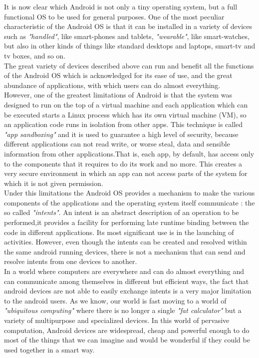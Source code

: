  It is now clear which Android is not only a tiny operating system, but a full functional OS to be used for general purposes. One of the most peculiar characteristic of the Android OS is that it can be installed in a variety of devices such as \textit{"handled"}, like smart-phones and tablets, \textit{"wearable"}, like smart-watches, but also in other kinds of things like standard desktops and laptops, smart-tv and tv boxes, and so on.\\
The great variety of devices described above can run and benefit all the functions of the Android OS which is acknowledged for its ease of use, and the great abundance of applications, with which users can do almost everything. \\
However, one of the greatest limitations of Android is that the system was designed to run on the top of a virtual machine and each  application which can be executed starts a Linux process which has its own virtual machine (VM), so an application code runs in isolation from other apps. This technique is called \textit{"app sandboxing"} and it is used to guarantee a high level of security, because different applications can not read write, or worse steal, data and sensible information from other applications.That is, each app, by default, has access only to the components that it requires to do its work and no more. This creates a very secure environment in which an app can not access parts of the system for which it is not given permission.\\
Under this limitations the Android OS provides a mechanism to make the various components of the applications and the operating system itself communicate : the so called \textit{"intents"}. An intent is an abstract description of an operation to be performed,it provides a facility for performing late runtime binding between the code in different applications. Its most significant use is in the launching of activities. However, even though the intents can be created and resolved within the same android running devices, there is not a mechanism that can send and resolve intents from one devices to another.\\
In a world where computers are everywhere and can do almost everything and can communicate among themselves in different but efficient ways, the fact that android devices are not able to easily exchange intents is a very major limitation to the android users. As we know, our world is fast moving to a world of \textit{"ubiquitous computing"} where there is no longer a single \textit{"fat calculator"} but a variety of multipurpose and specialized devices. In this world of pervasive computation, Android devices are widespread, cheap and powerful enough to do most of the things that we can imagine and would be wonderful if they could be used together in a smart way.
